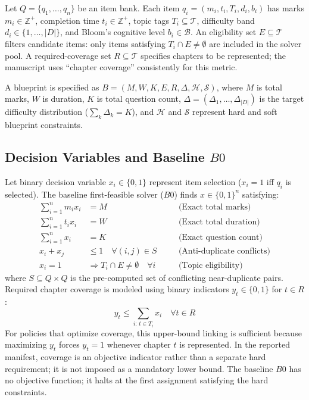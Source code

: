 \documentclass[runningheads]{llncs}
\begin{document}
Let $Q=\{q_1,\dots,q_n\}$ be an item bank. Each item $q_i=(m_i,t_i,T_i,d_i,b_i)$ has marks $m_i\in\mathbb{Z}^+$, completion time $t_i\in\mathbb{Z}^+$, topic tags $T_i\subseteq\mathcal{T}$, difficulty band $d_i\in\{1,\dots,|D|\}$, and Bloom's cognitive level $b_i\in\mathcal{B}$. An eligibility set $E\subseteq\mathcal{T}$ filters candidate items: only items satisfying $T_i\cap E\neq\emptyset$ are included in the solver pool. A required-coverage set $R\subseteq\mathcal{T}$ specifies chapters to be represented; the manuscript uses “chapter coverage” consistently for this metric.

A blueprint is specified as $B=(M,W,K,E,R,\Delta,\mathcal{H},\mathcal{S})$, where $M$ is total marks, $W$ is duration, $K$ is total question count, $\Delta=(\Delta_1,\dots,\Delta_{|D|})$ is the target difficulty distribution ($\sum_k\Delta_k=K$), and $\mathcal{H}$ and $\mathcal{S}$ represent hard and soft blueprint constraints.

\subsection{Decision Variables and Baseline $B0$}
Let binary decision variable $x_i\in\{0,1\}$ represent item selection ($x_i=1$ iff $q_i$ is selected). The baseline first-feasible solver ($B0$) finds $x\in\{0,1\}^n$ satisfying:
\begin{align}
\sum_{i=1}^n m_i x_i &= M \quad &&\text{(Exact total marks)} \label{eq:marks} \\
\sum_{i=1}^n t_i x_i &= W \quad &&\text{(Exact total duration)} \label{eq:time} \\
\sum_{i=1}^n x_i &= K \quad &&\text{(Exact question count)} \label{eq:count} \\
x_i + x_j &\le 1 \quad \forall (i,j)\in S \quad &&\text{(Anti-duplicate conflicts)} \label{eq:conflict} \\
x_i = 1 &\Rightarrow T_i\cap E\neq\emptyset \quad \forall i \quad &&\text{(Topic eligibility)} \label{eq:eligibility}
\end{align}
where $S\subseteq Q\times Q$ is the pre-computed set of conflicting near-duplicate pairs. Required chapter coverage is modeled using binary indicators $y_t\in\{0,1\}$ for $t\in R$:
\begin{equation}
y_t \le \sum_{i:\,t\in T_i} x_i \quad \forall t\in R \label{eq:coverage_link}
\end{equation}
For policies that optimize coverage, this upper-bound linking is sufficient because maximizing $y_t$ forces $y_t=1$ whenever chapter $t$ is represented. In the reported manifest, coverage is an objective indicator rather than a separate hard requirement; it is not imposed as a mandatory lower bound. The baseline $B0$ has no objective function; it halts at the first assignment satisfying the hard constraints.
\end{document}
